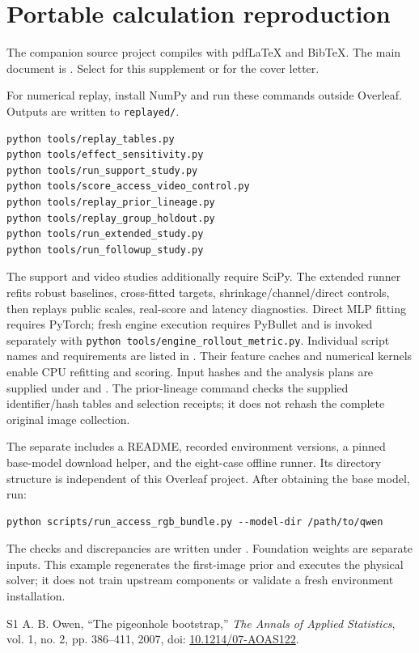 \documentclass[11pt]{article}
\begin{document}
\begingroup\small
\section{Portable calculation reproduction}
The companion source project compiles with pdfLaTeX and BibTeX. The main document is . Select  for this supplement or  for the cover letter.

For numerical replay, install NumPy and run these commands outside Overleaf. Outputs are written to \texttt{replayed/}.
\begin{verbatim}
python tools/replay_tables.py
python tools/effect_sensitivity.py
python tools/run_support_study.py
python tools/score_access_video_control.py
python tools/replay_prior_lineage.py
python tools/replay_group_holdout.py
python tools/run_extended_study.py
python tools/run_followup_study.py
\end{verbatim}
The support and video studies additionally require SciPy. The extended runner refits robust baselines, cross-fitted targets, shrinkage/channel/direct controls, then replays public scales, real-score and latency diagnostics. Direct MLP fitting requires PyTorch; fresh engine execution requires PyBullet and is invoked separately with \texttt{python tools/engine\_rollout\_metric.py}. Individual script names and requirements are listed in . Their feature caches and numerical kernels enable CPU refitting and scoring. Input hashes and the analysis plans are supplied under  and . The prior-lineage command checks the supplied identifier/hash tables and selection receipts; it does not rehash the complete original image collection.

The separate  includes a README, recorded environment versions, a pinned base-model download helper, and the eight-case offline runner. Its directory structure is independent of this Overleaf project. After obtaining the base model, run:
\begin{verbatim}
python scripts/run_access_rgb_bundle.py --model-dir /path/to/qwen
\end{verbatim}
The checks and discrepancies are written under . Foundation weights are separate inputs. This example regenerates the first-image prior and executes the physical solver; it does not train upstream components or validate a fresh environment installation.

\begin{thebibliography}{S1}
 A. B. Owen, ``The pigeonhole bootstrap,'' \emph{The Annals of Applied Statistics}, vol. 1, no. 2, pp. 386--411, 2007, doi: \href{https://doi.org/10.1214/07-AOAS122}{10.1214/07-AOAS122}.
\end{thebibliography}
\endgroup
\end{document}
